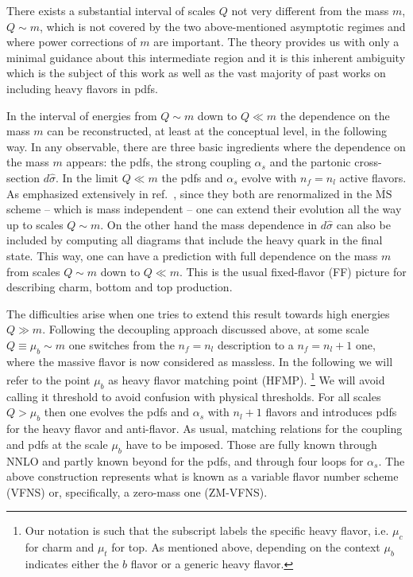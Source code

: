 \documentclass[letter,11pt]{article}
\def\as{\alpha_s}
\def\nf{{n_f}}
\def\nl{{n_l}}
\def\MSbar{\overline{\mathrm{MS}}}
\def\mub{\mu_b}
\begin{document}
There exists a substantial interval of scales $Q$ not very different from the mass $m$, $Q\sim m$, which is not covered by the two above-mentioned asymptotic regimes and where power corrections of $m$ are important. The theory provides us with only a minimal guidance about this intermediate region and it is this inherent ambiguity which is the subject of this work as well as the vast majority of past works on including heavy flavors in pdfs. 

In the interval of energies from $Q\sim m$ down to $Q\ll m$ the dependence on the mass $m$ can be reconstructed, at least at the conceptual level, in the following way. In any observable, there are three basic ingredients where the dependence on the mass $m$ appears: the pdfs, the strong coupling $\as$ and the partonic cross-section $d\hat\sigma$. In the limit $Q\ll m$ the pdfs and $\as$ evolve with $\nf=\nl$ active flavors. As emphasized extensively in ref.~\cite{Collins:1998rz}, since they both are renormalized in the $\MSbar$ scheme -- which is mass independent -- one can extend their evolution all the way up to scales $Q\sim m$. On the other hand the mass dependence in $d\hat\sigma$ can also be included by computing all diagrams that include the heavy quark in the final state. This way, one can have a prediction with full dependence on the mass $m$ from scales $Q\sim m$ down to $Q\ll m$. This is the usual fixed-flavor (FF) picture for describing charm, bottom and top production.

The difficulties arise when one tries to extend this result towards high energies $Q\gg m$. Following the decoupling approach discussed above, at some scale $Q\equiv\mub\sim m$ one switches from the $\nf=\nl$ description to a $\nf=\nl+1$ one, where the massive flavor is now considered as massless. In the following we will refer to the point $\mub$ as heavy flavor matching point (HFMP).
%
\footnote{Our notation is such that the subscript labels the specific heavy flavor, i.e. $\mu_c$ for charm and $\mu_t$ for top. As mentioned above, depending on the context $\mub$ indicates either the $b$ flavor or a generic heavy flavor.}
%
We will avoid calling it threshold to avoid confusion with physical thresholds. For all scales $Q>\mub$ then one evolves the pdfs and $\as$ with $\nl+1$ flavors and introduces pdfs for the heavy flavor and anti-flavor. As usual, matching relations for the coupling and pdfs at the scale $\mub$ have to be imposed. Those are fully known through NNLO \cite{Collins:1986mp,Buza:1995ie,Buza:1996wv} and partly known beyond \cite{Ablinger:2010ty,Blumlein:2012vq,Ablinger:2014lka,Ablinger:2014uka,Behring:2014eya} for the pdfs, and through four loops \cite{Schroder:2005hy,Chetyrkin:2005ia,Kniehl:2006bg} for $\as$. The above construction represents what is known as a variable flavor number scheme (VFNS) \cite{Aivazis:1993pi} or, specifically, a zero-mass one (ZM-VFNS).
\end{document}
